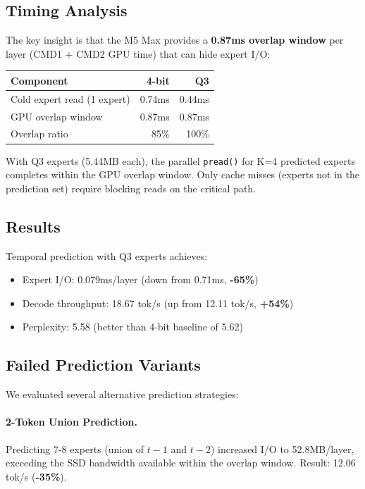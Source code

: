\documentclass[11pt,twocolumn]{article}
\begin{document}
\subsection{Timing Analysis}

The key insight is that the M5 Max provides a \textbf{0.87ms overlap window} per layer (CMD1 + CMD2 GPU time) that can hide expert I/O:

\begin{center}
\begin{tabular}{lrr}
\toprule
\textbf{Component} & \textbf{4-bit} & \textbf{Q3} \\
\midrule
Cold expert read (1 expert) & 0.74ms & 0.44ms \\
GPU overlap window & 0.87ms & 0.87ms \\
\midrule
Overlap ratio & 85\% & 100\% \\
\bottomrule
\end{tabular}
\end{center}

With Q3 experts (5.44MB each), the parallel \texttt{pread()} for K=4 predicted experts completes within the GPU overlap window. Only cache misses (experts not in the prediction set) require blocking reads on the critical path.

\subsection{Results}

Temporal prediction with Q3 experts achieves:
\begin{itemize}
    \item Expert I/O: 0.079ms/layer (down from 0.71ms, \textbf{-65\%})
    \item Decode throughput: 18.67 tok/s (up from 12.11 tok/s, \textbf{+54\%})
    \item Perplexity: 5.58 (better than 4-bit baseline of 5.62)
\end{itemize}

\subsection{Failed Prediction Variants}

We evaluated several alternative prediction strategies:

\paragraph{2-Token Union Prediction.} Predicting 7-8 experts (union of $t-1$ and $t-2$) increased I/O to 52.8MB/layer, exceeding the SSD bandwidth available within the overlap window. Result: 12.06 tok/s (\textbf{-35\%}).
\end{document}
